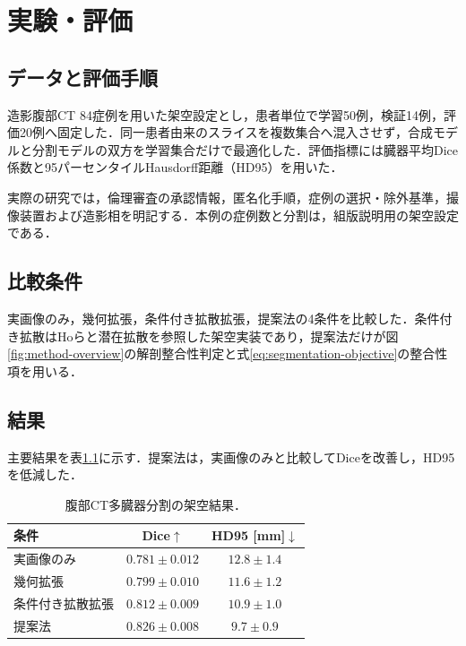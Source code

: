 \chapter{実験・評価}

\begin{center}
  \UsamiFictionalExampleNotice
\end{center}

\section{データと評価手順}
造影腹部CT 84症例を用いた架空設定とし，患者単位で学習50例，検証14例，評価20例へ固定した．同一患者由来のスライスを複数集合へ混入させず，合成モデルと分割モデルの双方を学習集合だけで最適化した．評価指標には臓器平均Dice係数と95パーセンタイルHausdorff距離（HD95）を用いた．

実際の研究では，倫理審査の承認情報，匿名化手順，症例の選択・除外基準，撮像装置および造影相を明記する．本例の症例数と分割は，組版説明用の架空設定である．

\section{比較条件}
実画像のみ，幾何拡張，条件付き拡散拡張，提案法の4条件を比較した．条件付き拡散はHoら\cite{ho2020ddpm}と潜在拡散\cite{rombach2022ldm}を参照した架空実装であり，提案法だけが図\ref{fig:method-overview}の解剖整合性判定と式\eqref{eq:segmentation-objective}の整合性項を用いる．

\section{結果}
主要結果を表\ref{tab:segmentation-results}に示す．提案法は，実画像のみと比較してDiceを改善し，HD95を低減した．

\begin{table}[tb]
  \centering
  \caption{腹部CT多臓器分割の架空結果．}
  \label{tab:segmentation-results}
  \begin{tabularx}{0.92\textwidth}{@{}Xcc@{}}
    \toprule
    条件 & Dice$\uparrow$ & HD95 [mm]$\downarrow$ \\
    \midrule
    実画像のみ & $0.781\pm0.012$ & $12.8\pm1.4$ \\
    幾何拡張 & $0.799\pm0.010$ & $11.6\pm1.2$ \\
    条件付き拡散拡張 & $0.812\pm0.009$ & $10.9\pm1.0$ \\
    提案法 & $\mathbf{0.826\pm0.008}$ & $\mathbf{9.7\pm0.9}$ \\
    \bottomrule
  \end{tabularx}
\end{table}

